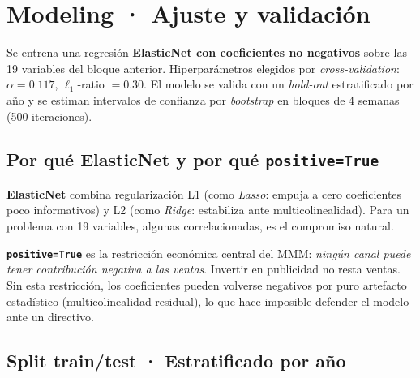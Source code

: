 \section{Modeling · Ajuste y validación}

\begin{takeaway}
Se entrena una regresión \textbf{ElasticNet con coeficientes no negativos} sobre las 19 variables del bloque anterior. Hiperparámetros elegidos por \textit{cross-validation}: $\alpha = 0.117$, $\ell_1$-ratio $= 0.30$. El modelo se valida con un \textit{hold-out} estratificado por año y se estiman intervalos de confianza por \textit{bootstrap} en bloques de 4 semanas (500 iteraciones).
\end{takeaway}

\subsection{Por qué ElasticNet y por qué \texttt{positive=True}}

\begin{decisionbox}
\textbf{ElasticNet} combina regularización L1 (como \textit{Lasso}: empuja a cero coeficientes poco informativos) y L2 (como \textit{Ridge}: estabiliza ante multicolinealidad). Para un problema con 19 variables, algunas correlacionadas, es el compromiso natural.
\end{decisionbox}

\begin{decisionbox}
\textbf{\texttt{positive=True}} es la restricción económica central del MMM: \textit{ningún canal puede tener contribución negativa a las ventas}. Invertir en publicidad no resta ventas. Sin esta restricción, los coeficientes pueden volverse negativos por puro artefacto estadístico (multicolinealidad residual), lo que hace imposible defender el modelo ante un directivo.
\end{decisionbox}

\subsection{Split train/test · Estratificado por año}

